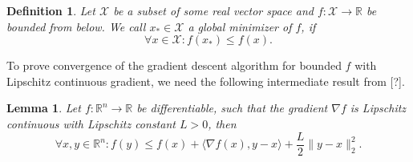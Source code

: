 \documentclass[11pt, a4paper]{article}
\newtheorem{lemma}[theorem]{Lemma}
\newtheorem{definition}[theorem]{Definition}
\newcommand{\R}{\mathds{R}}
\newcommand{\X}{\mathcal{X}}
\begin{document}
\begin{definition}
Let $\X$ be a subset of some real vector space and $f: \X \to \R$ be bounded from below. We call $x_* \in \X$ a global minimizer of $f$, if
\[ \forall x \in \X : f(x_*) \leq f(x). \]
\end{definition}

To prove convergence of the gradient descent algorithm for bounded $f$ with Lipschitz continuous gradient, we need the following intermediate result from [?].

\begin{lemma} \label{lem:descent}
Let $f: \R^n \to \R$ be differentiable, such that the gradient $\nabla f$ is Lipschitz continuous with Lipschitz constant $L>0$, then
\[ \forall x,y \in \R^n : f(y) \leq f(x) + \big \langle \nabla f(x) , y -x \big \rangle + \frac{L}{2} \big \| y - x \big \|_2^2. \]
\end{lemma}
\end{document}
